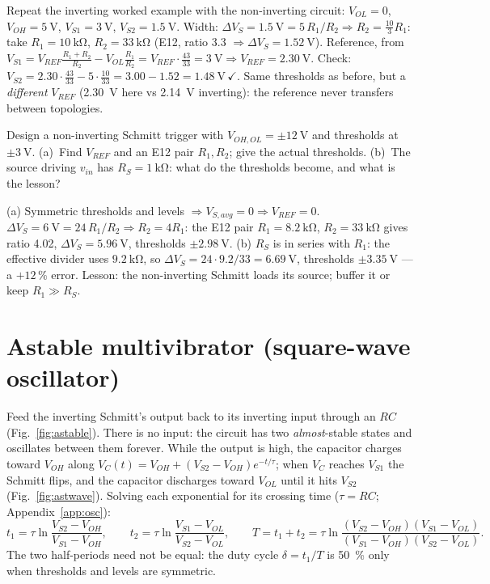 \documentclass[11pt,a4paper,oneside]{book}
\begin{document}
\begin{wexample}
Repeat the inverting worked example with the non-inverting circuit:
$V_{OL}=0$, $V_{OH}=\qty{5}{\volt}$, $V_{S1}=\qty{3}{\volt}$,
$V_{S2}=\qty{1.5}{\volt}$. Width:
$\Delta V_S=\qty{1.5}{\volt}=5\,R_1/R_2\Rightarrow R_2=\tfrac{10}{3}R_1$:
take $R_1=\qty{10}{\kilo\ohm}$, $R_2=\qty{33}{\kilo\ohm}$ (E12, ratio 3.3
$\Rightarrow\Delta V_S=\qty{1.52}{\volt}$). Reference, from
$V_{S1}=V_{REF}\frac{R_1+R_2}{R_2}-V_{OL}\frac{R_1}{R_2}
=V_{REF}\cdot\frac{43}{33}=\qty{3}{\volt}\Rightarrow
V_{REF}=\qty{2.30}{\volt}$. Check:
$V_{S2}=2.30\cdot\frac{43}{33}-5\cdot\frac{10}{33}=3.00-1.52=\qty{1.48}{\volt}\,\checkmark$.
Same thresholds as before, but a \emph{different} $V_{REF}$
(\qty{2.30}{\volt} here vs \qty{2.14}{\volt} inverting): the reference never
transfers between topologies.
\end{wexample}

\begin{exercise}
Design a non-inverting Schmitt trigger with $V_{OH,OL}=\pm\qty{12}{\volt}$ and
thresholds at $\pm\qty{3}{\volt}$. (a)~Find $V_{REF}$ and an E12 pair
$R_1,R_2$; give the actual thresholds. (b)~The source driving $v_{in}$ has
$R_S=\qty{1}{\kilo\ohm}$: what do the thresholds become, and what is the
lesson?
\end{exercise}
\begin{solution}
(a) Symmetric thresholds and levels $\Rightarrow V_{S,avg}=0\Rightarrow
V_{REF}=0$. $\Delta V_S=\qty{6}{\volt}=24\,R_1/R_2\Rightarrow R_2=4R_1$: the
E12 pair $R_1=\qty{8.2}{\kilo\ohm}$, $R_2=\qty{33}{\kilo\ohm}$ gives ratio
4.02, $\Delta V_S=\qty{5.96}{\volt}$, thresholds $\pm\qty{2.98}{\volt}$.
(b) $R_S$ is in series with $R_1$: the effective divider uses
$\qty{9.2}{\kilo\ohm}$, so $\Delta V_S=24\cdot9.2/33=\qty{6.69}{\volt}$,
thresholds $\pm\qty{3.35}{\volt}$ --- a $+12\,\%$ error. Lesson: the
non-inverting Schmitt loads its source; buffer it or keep
$R_1\gg R_S$.
\end{solution}

\section{Astable multivibrator (square-wave oscillator)}
Feed the inverting Schmitt's output back to its inverting input through an
$RC$ (Fig.~\ref{fig:astable}). There is no input: the circuit has two
\emph{almost}-stable states and oscillates between them forever. While the
output is high, the capacitor charges toward $V_{OH}$ along
$V_C(t)=V_{OH}+(V_{S2}-V_{OH})e^{-t/\tau}$; when $V_C$ reaches $V_{S1}$ the
Schmitt flips, and the capacitor discharges toward $V_{OL}$ until it hits
$V_{S2}$ (Fig.~\ref{fig:astwave}). Solving each exponential for its crossing
time ($\tau=RC$; Appendix~\ref{app:osc}):
\[
  t_1=\tau\ln\frac{V_{S2}-V_{OH}}{V_{S1}-V_{OH}},\qquad
  t_2=\tau\ln\frac{V_{S1}-V_{OL}}{V_{S2}-V_{OL}},\qquad
  T=t_1+t_2=\tau\ln\!\frac{(V_{S2}-V_{OH})(V_{S1}-V_{OL})}
  {(V_{S1}-V_{OH})(V_{S2}-V_{OL})}.
\]
The two half-periods need not be equal: the duty cycle $\delta=t_1/T$ is
\qty{50}{\percent} only when thresholds and levels are symmetric.
\end{document}
